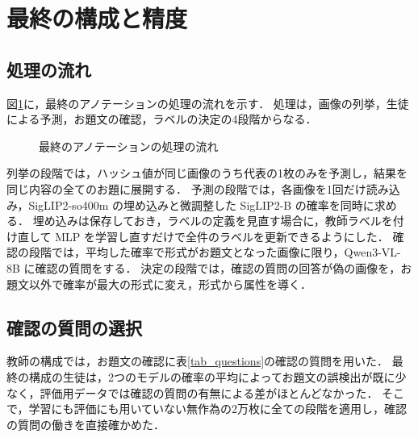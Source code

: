 \section{最終の構成と精度}
\label{sec_final}
\subsection{処理の流れ}
図\ref{fig_pipeline}に，最終のアノテーションの処理の流れを示す．
処理は，画像の列挙，生徒による予測，お題文の確認，ラベルの決定の4段階からなる．

\begin{figure}[t]
    \centering
    \caption{最終のアノテーションの処理の流れ}
    \label{fig_pipeline}
\end{figure}

列挙の段階では，ハッシュ値が同じ画像のうち代表の1枚のみを予測し，結果を同じ内容の全てのお題に展開する．
予測の段階では，各画像を1回だけ読み込み，SigLIP2-so400m の埋め込みと微調整した SigLIP2-B の確率を同時に求める．
埋め込みは保存しておき，ラベルの定義を見直す場合に，教師ラベルを付け直して MLP を学習し直すだけで全件のラベルを更新できるようにした．
確認の段階では，平均した確率で形式がお題文となった画像に限り，Qwen3-VL-8B に確認の質問をする．
決定の段階では，確認の質問の回答が偽の画像を，お題文以外で確率が最大の形式に変え，形式から属性を導く．

\subsection{確認の質問の選択}
教師の構成では，お題文の確認に表\ref{tab_questions}の確認の質問を用いた．
最終の構成の生徒は，2つのモデルの確率の平均によってお題文の誤検出が既に少なく，評価用データでは確認の質問の有無による差がほとんどなかった．
そこで，学習にも評価にも用いていない無作為の2万枚に全ての段階を適用し，確認の質問の働きを直接確かめた．

